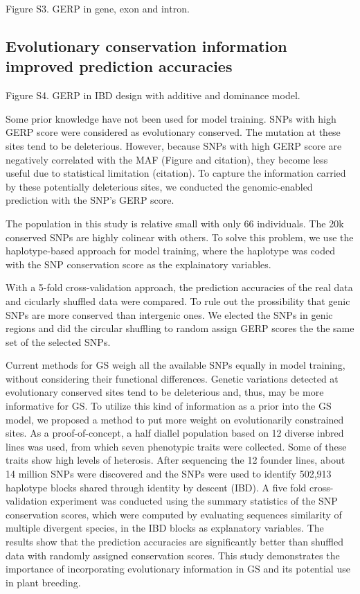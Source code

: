 \documentclass[10pt]{article}
\begin{document}
Figure S3. GERP in gene, exon and intron.


\subsection*{Evolutionary conservation information improved prediction accuracies}

Figure S4. GERP in IBD design with additive and dominance model.

Some prior knowledge have not been used for model training. 
SNPs with high GERP score were considered as evolutionary conserved. The mutation at these sites tend to be deleterious. However, because SNPs with high GERP score are negatively correlated with the MAF (Figure and citation), they become less useful due to statistical limitation (citation). To capture the information carried by these potentially deleterious sites, we conducted the genomic-enabled prediction with the SNP's GERP score. 

The population in this study is relative small with only 66 individuals. The 20k conserved SNPs are highly colinear with others. To solve this problem, we use the haplotype-based approach for model training, where the haplotype was coded with the SNP conservation score as the explainatory variables. 

With a 5-fold cross-validation approach, the prediction accuracies of the real data and cicularly shuffled data were compared. To rule out the prossibility that genic SNPs are more conserved than intergenic ones. We elected the SNPs in genic regions and did the circular shuffling to random assign GERP scores the the same set of the selected SNPs.



Current methods for GS weigh all the available SNPs equally in model training, without considering their functional differences. Genetic variations detected at evolutionary conserved sites tend to be deleterious and, thus, may be more informative for GS. To utilize this kind of information as a prior into the GS model, we proposed a method to put more weight on evolutionarily constrained sites. As a proof-of-concept, a half diallel population based on 12 diverse inbred lines was used, from which seven phenotypic traits were collected. Some of these traits show high levels of heterosis. After sequencing the 12 founder lines, about 14 million SNPs were discovered and the SNPs were used to identify 502,913 haplotype blocks shared through identity by descent (IBD). A five fold cross-validation experiment was conducted using the summary statistics of the SNP conservation scores, which were computed by evaluating sequences similarity of multiple divergent species, in the IBD blocks as explanatory variables. The results show that the prediction accuracies are significantly better than shuffled data with randomly assigned conservation scores. This study demonstrates the importance of incorporating evolutionary information in GS and its potential use in plant breeding.
\end{document}
